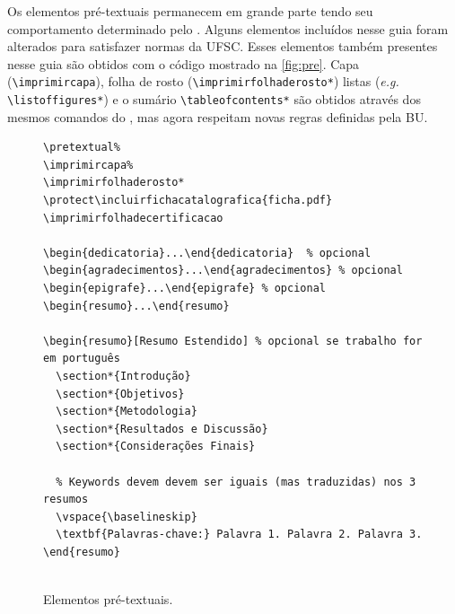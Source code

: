 \documentclass[embeddedlogo]{../ufsc-thesis-rn46-2019}
\newcommand{\lacmd}[1]{\texttt{\textbackslash{}#1}}
\begin{document}
Os elementos pré-textuais permanecem em grande parte tendo seu comportamento
determinado pelo \abnTeX. Alguns elementos incluídos nesse guia foram alterados
para satisfazer normas da UFSC. Esses elementos também presentes nesse guia são
obtidos com o código mostrado na \autoref{fig:pre}. Capa (\lacmd{imprimircapa}),
folha de rosto (\lacmd{imprimirfolhaderosto*}) listas (\emph{e.g.}
\lacmd{listoffigures*}) e o sumário \lacmd{tableofcontents*} são obtidos através
dos mesmos comandos do \abnTeX, mas agora respeitam novas regras definidas pela
BU.

\begin{figure}[tb]
  \centering
  \caption{Elementos pré-textuais.}
  \label{fig:pre}
  \begin{verbatim}
\pretextual%
\imprimircapa%
\imprimirfolhaderosto*
\protect\incluirfichacatalografica{ficha.pdf}
\imprimirfolhadecertificacao

\begin{dedicatoria}...\end{dedicatoria}  % opcional
\begin{agradecimentos}...\end{agradecimentos} % opcional
\begin{epigrafe}...\end{epigrafe} % opcional
\begin{resumo}...\end{resumo} 

\begin{resumo}[Resumo Estendido] % opcional se trabalho for em português
  \section*{Introdução}
  \section*{Objetivos} 
  \section*{Metodologia} 
  \section*{Resultados e Discussão} 
  \section*{Considerações Finais} 

  % Keywords devem devem ser iguais (mas traduzidas) nos 3 resumos  
  \vspace{\baselineskip}
  \textbf{Palavras-chave:} Palavra 1. Palavra 2. Palavra 3. 
\end{resumo}


\end{verbatim}
\end{figure}
\end{document}
